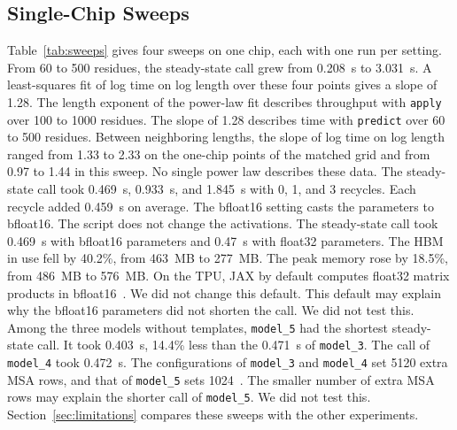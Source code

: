 \subsection{Single-Chip Sweeps}\label{sec:res-sweeps}
\begin{table}[t]
\caption{\capTabSweeps}\label{tab:sweeps}
\centering\small{}
\end{table}

Table~\ref{tab:sweeps} gives four sweeps on one chip, each with one run per setting. From 60 to 500 residues, the steady-state call grew from 0.208~s to 3.031~s. %
A least-squares fit of log time on log length over these four points gives a slope of 1.28. %
The length exponent of the power-law fit describes throughput with \texttt{apply} over 100 to 1000 residues. The slope of 1.28 describes time with \texttt{predict} over 60 to 500 residues. %
Between neighboring lengths, the slope of log time on log length ranged from 1.33 to 2.33 on the one-chip points of the matched grid and from 0.97 to 1.44 in this sweep. %
No single power law describes these data.
The steady-state call took 0.469~s, 0.933~s, and 1.845~s with 0, 1, and 3 recycles. Each recycle added 0.459~s on average. %
The bfloat16 setting casts the parameters to bfloat16. The script does not change the activations.
The steady-state call took 0.469~s with bfloat16 parameters and 0.47~s with float32 parameters. %
The HBM in use fell by 40.2\%, from 463~MB to 277~MB. %
The peak memory rose by 18.5\%, from 486~MB to 576~MB. %
On the TPU, JAX by default computes float32 matrix products in bfloat16~\cite{jaxmatmulprecision}. We did not change
this default. This default may explain why the bfloat16 parameters did not shorten the call. We did not test this.
Among the three models without templates, \texttt{model\_5} had the shortest steady-state call. It took 0.403~s, 14.4\% less than the 0.471~s of \texttt{model\_3}. The call of \texttt{model\_4} took 0.472~s. %
The configurations of \texttt{model\_3} and \texttt{model\_4} set 5120 extra MSA rows, and that of \texttt{model\_5} sets 1024~\cite{alphafoldrepo}. %
The smaller number of extra MSA rows may explain the shorter call of \texttt{model\_5}. We did not test this.
Section~\ref{sec:limitations} compares these sweeps with the other experiments.
